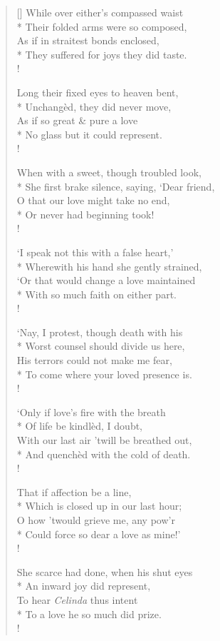 \documentclass[MAIN]{subfiles}
\begin{document}
\begin{verse}[\versewidth]
While over either's compassed waist\\*
\vin Their folded arms were so composed,\\
\vin As if in straitest bonds enclosed,\\*
They suffered for joys they did taste.\\!

Long their fixed eyes to heaven bent,\\*
\vin Unchang\`ed, they did never move,\\
\vin As if so great \& pure a love\\*
No glass but it could represent.\\!

When with a sweet, though troubled look,\\*
\vin She first brake silence, saying, `Dear friend,\\
\vin O that our love might take no end,\\*
Or never had beginning took!\\!

`I speak not this with a false heart,'\\*
\vin Wherewith his hand she gently strained,\\
\vin `Or that would change a love maintained\\*
With so much faith on either part.\\!

`Nay, I protest, though death with his\\*
\vin Worst counsel should divide us here,\\
\vin His terrors could not make me fear,\\*
To come where your loved presence is.\\!

`Only if love's fire with the breath\\*
\vin Of life be kindl\`ed, I doubt,\\
\vin With our last air 'twill be breathed out,\\*
And quench\`ed with the cold of death.\\!

That if affection be a line,\\*
\vin Which is closed up in our last hour;\\
\vin O how 'twould grieve me, any pow'r\\*
Could force so dear a love as mine!'\\!

She scarce had done, when his shut eyes\\*
\vin An inward joy did represent,\\
\vin To hear \emph{Celinda} thus intent\\*
To a love he so much did prize.\\!


\end{verse}
\end{document}
